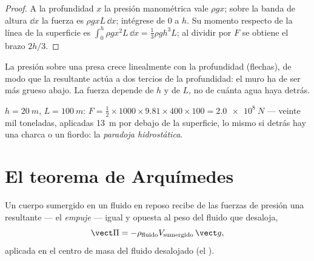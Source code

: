 \begin{proof}
A la profundidad $x$ la presión manométrica vale $\rho gx$; sobre la banda
de altura $\dd x$ la fuerza es $\rho gxL\,\dd x$; intégrese de $0$ a $h$. Su
momento respecto de la línea de la superficie es
$\int_0^h\rho gx^2L\,\dd x = \tfrac13\rho gh^3L$; al dividir por $F$ se
obtiene el brazo $2h/3$.
\end{proof}

\begin{omfigure}

{\small La presión sobre una presa crece linealmente con la profundidad
(flechas), de modo que la resultante actúa a dos tercios de la
profundidad: el muro ha de ser más grueso abajo. La fuerza depende de $h$
y de $L$, no de cuánta agua haya detrás.}
\end{omfigure}

\begin{example}\label{ex:b1:fluid-statics:dam}
$h = \qty{20}{m}$, $L = \qty{100}{m}$: $F = \tfrac12 \times 1000 \times 9.81 \times
400 \times 100 = \qty{2.0e8}{N}$ --- veinte mil toneladas, aplicadas
\qty{13}{m} por debajo de la superficie, lo mismo si detrás hay una charca
o un fiordo: la \emph{paradoja hidrostática}.
\end{example}

\section{El teorema de Arquímedes}

\begin{theorem}[Arquímedes]\label{thm:b1:fluid-statics:archimedes}
Un cuerpo sumergido en un fluido en reposo recibe de las fuerzas de
presión una resultante --- el \emph{empuje} --- igual y opuesta al peso del
fluido que desaloja,
\[
\vect\Pi = -\rho_{\text{fluido}}V_{\text{sumergido}}\,\vect g ,
\]
aplicada en el centro de masa del fluido desalojado (el \emph{}).
\end{theorem}

